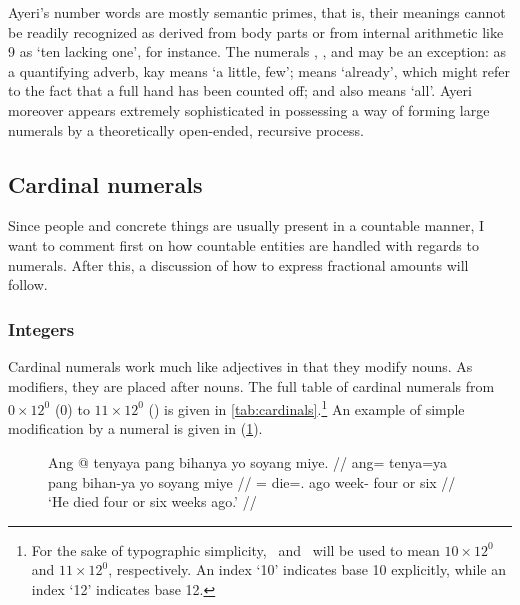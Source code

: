 Ayeri's number words are mostly semantic primes, that is, their meanings cannot
be readily recognized as derived from body parts \citep[74]{dixon2012} or from
internal arithmetic like 9 as `ten lacking one', for instance. The numerals
, , and  may
be an exception: as a quantifying adverb,  {kay} means `a little,
few';  means `already', which might refer to the fact that a
full hand has been counted off; and  also means `all'. Ayeri
moreover appears extremely sophisticated in possessing a way of forming large
numerals by a theoretically open-ended, recursive process.

\subsection{Cardinal numerals}

Since people and concrete things are usually present in a countable manner, I
want to comment first on how countable entities are handled with regards to
numerals. After this, a discussion of how to express fractional amounts will
follow.

\subsubsection{Integers}

Cardinal numerals work much like adjectives in that they modify nouns. As
modifiers, they are placed after nouns. The full table of cardinal numerals
from $0 \times 12^0$ (0) to $11 \times 12^0$ (\elv) is given in
\autoref{tab:cardinals}.\footnote{For the sake of typographic simplicity, \ten\
and \elv\ will be used to mean $10 \times 12^0$ and $11 \times 12^0$,
respectively. An index `10' indicates base 10 explicitly, while an index `12'
indicates base 12.} An example of simple modification by a numeral is given in
(\ref{ex:nummod}).

\begin{figure}[h]
\ex\label{ex:nummod}
\begingl
	\gla Ang @ tenyaya pang bihanya yo soyang miye. //
	\glb ang= tenya=ya pang bihan-ya yo soyang miye //
	\glc \AgtT{}= die=\TsgM{}.\Top{} ago week-\Loc{} four or six //
	\glft `He died four or six weeks ago.' //
\endgl
\xe
\end{figure}

